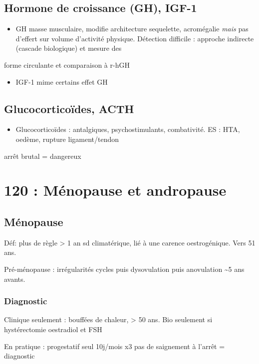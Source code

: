 \documentclass[11pt]{article}
\begin{document}
\subsection{Hormone de croissance (GH), IGF-1}
\label{sec:orgccc523d}
\begin{itemize}
\item GH \inc masse musculaire, modifie architecture sequelette, acromégalie \emph{mais}
pas d'effert sur volume d'activité physique. Détection difficile : approche indirecte (cascade biologique) et mesure des
\end{itemize}
forme circulante et comparaison à r-hGH
\begin{itemize}
\item IGF-1 mime certains effet GH
\end{itemize}

\subsection{Glucocorticoïdes, ACTH}
\label{sec:org7c1ed69}
\begin{itemize}
\item Glucocorticoïdes : antalgiques, psychostimulants, combativité. ES : HTA,
oedème, rupture ligament/tendon
\end{itemize}
\danger arrêt brutal = dangereux \skull

\section{120 : Ménopause et andropause}
\label{sec:org6ab3616}
\label{sec:120}
\subsection{Ménopause}
\label{sec:org047e94c}
Déf: plus de règle > 1 an \textpm{} sd climatérique, lié à une carence
oestrogénique. Vers 51 ans.

Pré-ménopause : irrégularités cycles puis dysovulation puis anovulation \textasciitilde{}5 ans
avants.

\subsubsection{Diagnostic}
\label{sec:org2627355}
Clinique seulement \danger : bouffées de chaleur, \female > 50 ans. Bio
seulement si hystérectomie \thus \dec oestradiol et \inc FSH

En pratique : progestatif seul 10j/mois x3 \thus pas de saignement à l'arrêt =
diagnostic
\end{document}
